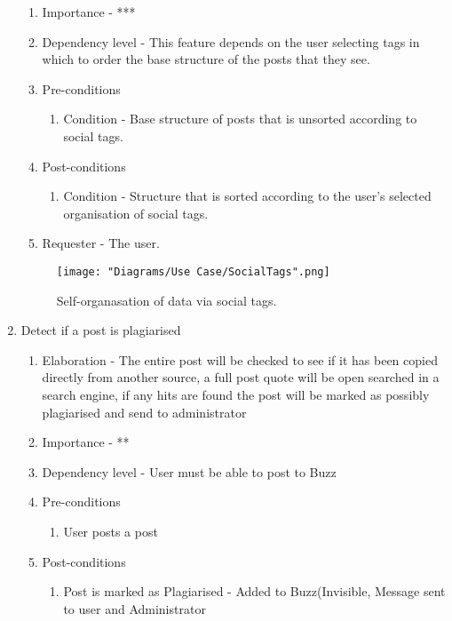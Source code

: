 \documentclass[12pt]{article}
\begin{document}
\begin{enumerate}
\begin{enumerate}
    \item Importance - ***
    \item Dependency level - This feature depends on the user selecting tags in which to order the base structure of the posts that they see.
    \item Pre-conditions
    \begin{enumerate}
    	\item Condition - Base structure of posts that is unsorted according to social tags.
    \end{enumerate}
        \item Post-conditions
    \begin{enumerate}
    	\item Condition - Structure that is sorted according to the user's selected organisation of social tags.
    \end{enumerate}
    \item Requester - The user.
  \end{enumerate}
\clearpage %
    \begin{figure}[h]
    	\centering
    	\texttt{[image: "Diagrams/Use Case/SocialTags".png]}
    	\caption{Self-organasation of data via social tags.}
    \end{figure}
\clearpage %
   \item Detect if a post is plagiarised  %
  \begin{enumerate}
    \item Elaboration - The entire post will be checked to see if it has been copied directly from another source, a full post quote will be open searched in a search engine, if any hits are found the post will be marked as possibly plagiarised and send to administrator
    \item Importance - **
    \item Dependency level - User must be able to post to Buzz
    \item Pre-conditions
    \begin{enumerate}
    	\item User posts a post
    \end{enumerate}
        \item Post-conditions
    \begin{enumerate}
    	\item Post is marked as Plagiarised - Added to Buzz(Invisible, Message sent to user and Administrator

\end{enumerate}
\end{enumerate}
\end{enumerate}
\end{document}
